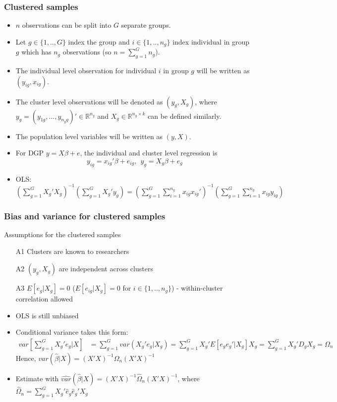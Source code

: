 \documentclass[aspectratio=169]{beamer}
\begin{document}
\begin{frame}
\frametitle{Clustered samples}
\begin{itemize}
\item $n$ observations can be split into $G$ separate groups. 
\item Let $g\in\{1,..,G\}$ index the group and $i\in\{1,..,n_g\}$ index individual in group $g$ which has $n_g$ observations (so $n=\sum_{g=1}^G n_g$).  
\item The individual level observation for individual $i$ in group $g$ will be written as $(y_{ig}, x_{ig})$. 
\item The cluster level observations will be denoted as $(y_{g}, X_{g})$, where $y_g = (y_{1g},...,y_{n_{g}g})'\in\mathbb{R}^{n_g}$ and $X_g\in\mathbb{R}^{n_g\times k}$ can be defined similarly. 
\item The population level variables will be written as $(y,X)$.
\item For DGP $y=X\beta+e$, the individual and cluster level regression is
\[
y_{ig} = x_{ig}'\beta+e_{ig}, \ \ y_{g} = X_{g}\beta+e_{g}
\]
\item OLS: $\left(\sum_{g=1}^G X_g'X_g\right)^{-1}\left(\sum_{g=1}^G X_g'y_g\right)=\left(\sum_{g=1}^G\sum_{i=1}^{n_g} x_{ig}x_{ig}'\right)^{-1}\left(\sum_{g=1}^G\sum_{i=1}^{n_g}x_{ig}y_{ig}\right)$
\end{itemize}
\end{frame}

\begin{frame}
\frametitle{Bias and variance for clustered samples}
\begin{block}{Assumptions for the clustered samples}
\begin{itemize}
\item[A1] Clusters are known to researchers
\item[A2] $(y_g, X_g)$ are independent across clusters
\item[A3] $E[e_g|X_g]=0$ ($E[e_{ig}|X_g]=0$ for $i\in\{1,..,n_g\}$) - within-cluster correlation allowed
\end{itemize}
\end{block}
\begin{itemize}
\item OLS is still unbiased
\item Conditional variance takes this form: 
\[
\begin{aligned}
var\left[\sum_{g=1}^G X_g'e_g |X\right]&=\sum_{g=1}^G var(X_g'e_g|X_g)=\sum_{g=1}^G X_g'E[e_ge_g'|X_g]X_g=\sum_{g=1}^G X_g'D_gX_g=\Omega_n
\end{aligned}
\]
Hence, $var(\hat{\beta}|X)=(X'X)^{-1}\Omega_n(X'X)^{-1}$
\item Estimate with $\widehat{var}(\hat{\beta}|X)=(X'X)^{-1}\widehat{\Omega}_n(X'X)^{-1}$, where $\widehat{\Omega}_n=\sum_{g=1}^G X_g'\hat{e}_g\hat{e}_g'X_g$
\end{itemize}
\end{frame}
\end{document}

